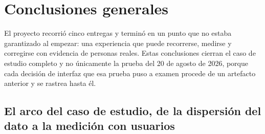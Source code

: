 %
%
%
%

\clearpage
\section{Conclusiones generales}\label{sec:a5-conclusiones}

El proyecto recorrió cinco entregas y terminó en un punto que no estaba garantizado al empezar:
una experiencia que puede recorrerse, medirse y corregirse con evidencia de personas reales.
Estas conclusiones cierran el caso de estudio completo y no únicamente la prueba del 20 de agosto
de 2026, porque cada decisión de interfaz que esa prueba puso a examen procede de un artefacto
anterior y se rastrea hasta él.

\subsection{El arco del caso de estudio, de la dispersión del dato a la medición con usuarios}

